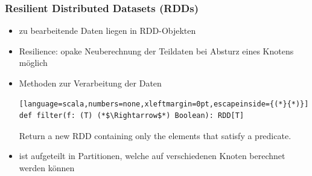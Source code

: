 \begin{frame}[fragile]
    \frametitle{Resilient Distributed Datasets (RDDs)}
    \begin{itemize}
        \item zu bearbeitende Daten liegen in RDD-Objekten
        \item Resilience: opake Neuberechnung der Teildaten bei Absturz eines Knotens möglich
        \item Methoden zur Verarbeitung der Daten
              \begin{tcolorbox}[boxsep=0pt]
                \begin{lstlisting}[language=scala,numbers=none,xleftmargin=0pt,escapeinside={(*}{*)}]
def filter(f: (T) (*$\Rightarrow$*) Boolean): RDD[T]
\end{lstlisting}\vspace{-1.5\baselineskip}
              Return a new RDD containing only the elements that satisfy a predicate.
              \end{tcolorbox}
        \item ist aufgeteilt in Partitionen, welche auf verschiedenen Knoten berechnet werden können %
    \end{itemize}
\end{frame}


